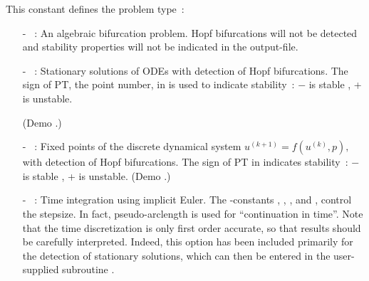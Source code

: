 This constant defines the problem type~:
\begin{itemize}
\item[-] ~: 
  An algebraic bifurcation problem.
  Hopf bifurcations will not be detected and stability
  properties will not be indicated in the  output-file.
\item[-] ~: 
  Stationary solutions of ODEs with detection of Hopf bifurcations.
  The sign of PT, the point number, in  is used 
  to indicate stability~: $-$ is stable , + is unstable.

 (Demo .)
\item[-] ~:  
  Fixed points of the discrete dynamical system
  $u^{(k+1)}=f(u^{(k)},p ),$ with detection of Hopf bifurcations.
  The sign of PT in  indicates stability~: 
  $-$ is stable , + is unstable.  
 (Demo .)
\item[-] ~: 
  Time integration using implicit Euler. 
  The \AUTO-constants , , , and ,  control 
  the stepsize.
  In fact, pseudo-arclength is used for ``continuation in time''. 
  Note that the time discretization is only first order accurate, 
  so that results should be carefully interpreted. 
  Indeed, this option has been included primarily for the detection 
  of stationary solutions, which can then be entered in the user-supplied
  subroutine .  


\end{itemize}
